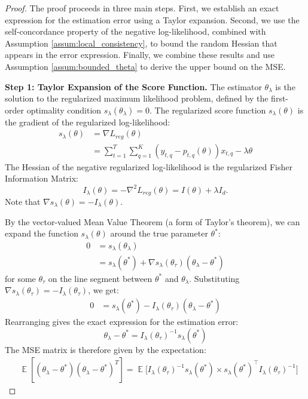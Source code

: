 \documentclass{article}
\DeclareMathOperator*{\E}{\mathbb{E}} %
\begin{document}
\begin{proof}
The proof proceeds in three main steps. First, we establish an exact expression for the estimation error using a Taylor expansion. Second, we use the self-concordance property of the negative log-likelihood, combined with Assumption \ref{assum:local_consistency}, to bound the random Hessian that appears in the error expression. Finally, we combine these results and use Assumption \ref{assum:bounded_theta} to derive the upper bound on the MSE.

\textbf{Step 1: Taylor Expansion of the Score Function.}
The estimator $\theta_\lambda$ is the solution to the regularized maximum likelihood problem, defined by the first-order optimality condition $s_\lambda(\theta_\lambda) = 0$. The regularized score function $s_\lambda(\theta)$ is the gradient of the regularized log-likelihood:
\begin{align*}
s_\lambda(\theta)
&= \nabla L_{reg}(\theta) \\
&= \sum_{t=1}^T \sum_{q=1}^K (y_{t,q} - p_{t,q}(\theta)) x_{t,q} - \lambda \theta
\end{align*}
The Hessian of the negative regularized log-likelihood is the regularized Fisher Information Matrix:
\[
I_\lambda(\theta) = -\nabla^2 L_{reg}(\theta) = I(\theta) + \lambda I_d.
\]
Note that $\nabla s_\lambda(\theta) = -I_\lambda(\theta)$.

By the vector-valued Mean Value Theorem (a form of Taylor's theorem), we can expand the function $s_\lambda(\theta)$ around the true parameter $\theta^*$:
\begin{align*}
0 &= s_\lambda(\theta_\lambda) \\
&= s_\lambda(\theta^*) + \nabla s_\lambda(\theta_\tau)(\theta_\lambda - \theta^*)
\end{align*}
for some $\theta_\tau$ on the line segment between $\theta^*$ and $\theta_\lambda$. Substituting $\nabla s_\lambda(\theta_\tau) = -I_\lambda(\theta_\tau)$, we get:
\begin{align*}
0 &= s_\lambda(\theta^*) - I_\lambda(\theta_\tau)(\theta_\lambda - \theta^*)
\end{align*}
Rearranging gives the exact expression for the estimation error:
\[
\theta_\lambda - \theta^* = I_\lambda(\theta_\tau)^{-1} s_\lambda(\theta^*)
\]
The MSE matrix is therefore given by the expectation:
\begin{align*}
&\E[(\theta_\lambda - \theta^*)(\theta_\lambda - \theta^*)^T] = \E\Big[I_\lambda(\theta_\tau)^{-1} s_\lambda(\theta^*) \times s_\lambda(\theta^*)^\top I_\lambda(\theta_\tau)^{-1}\Big]
\end{align*}


\end{proof}
\end{document}
